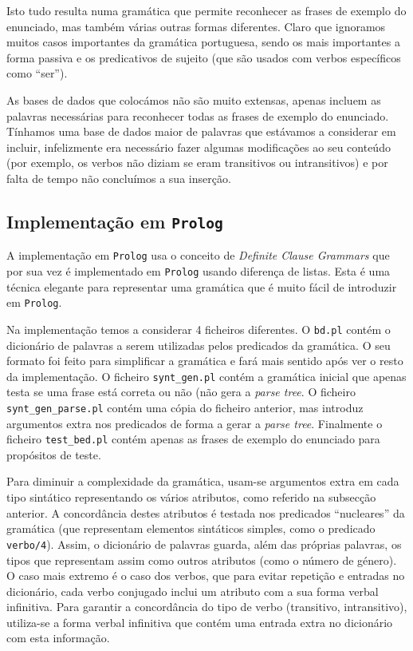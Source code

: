 \documentclass[12pt,a4paper,oneside]{article}
\begin{document}
Isto tudo resulta numa gramática que permite reconhecer as frases de
exemplo do enunciado, mas também várias outras formas
diferentes. Claro que ignoramos muitos casos importantes da gramática
portuguesa, sendo os mais importantes a forma passiva e os
predicativos de sujeito (que são usados com verbos específicos como
``ser'').

As bases de dados que colocámos não são muito extensas, apenas incluem
as palavras necessárias para reconhecer todas as frases de exemplo do
enunciado. Tínhamos uma base de dados maior de palavras que estávamos
a considerar em incluir, infelizmente era necessário fazer algumas
modificações ao seu conteúdo (por exemplo, os verbos não diziam se
eram transitivos ou intransitivos) \cite{label:2003} e por falta de
tempo não concluímos a sua inserção.

\subsection{Implementação em \texttt{Prolog}}

A implementação em \texttt{Prolog} usa o conceito de \textit{Definite
  Clause Grammars} que por sua vez é implementado em \texttt{Prolog}
usando diferença de listas. Esta é uma técnica elegante para
representar uma gramática que é muito fácil de introduzir em
\texttt{Prolog}.

Na implementação temos a considerar 4 ficheiros diferentes. O
\texttt{bd.pl} contém o dicionário de palavras a serem utilizadas
pelos predicados da gramática. O seu formato foi feito para
simplificar a gramática e fará mais sentido após ver o resto da
implementação. O ficheiro \texttt{synt\_gen.pl} contém a gramática
inicial que apenas testa se uma frase está correta ou não (não gera a
\textit{parse tree}. O ficheiro \texttt{synt\_gen\_parse.pl} contém
uma cópia do ficheiro anterior, mas introduz argumentos extra nos
predicados de forma a gerar a \textit{parse tree}. Finalmente o
ficheiro \texttt{test\_bed.pl} contém apenas as frases de exemplo do
enunciado para propósitos de teste.

Para diminuir a complexidade da gramática, usam-se argumentos extra em
cada tipo sintático representando os vários atributos, como referido
na subsecção anterior. A concordância destes atributos é testada nos
predicados ``nucleares'' da gramática (que representam elementos
sintáticos simples, como o predicado \texttt{verbo/4}). Assim, o
dicionário de palavras guarda, além das próprias palavras, os tipos
que representam assim como outros atributos (como o número de
género). O caso mais extremo é o caso dos verbos, que para evitar
repetição e entradas no dicionário, cada verbo conjugado inclui um
atributo com a sua forma verbal infinitiva. Para garantir a
concordância do tipo de verbo (transitivo, intransitivo), utiliza-se a
forma verbal infinitiva que contém uma entrada extra no dicionário com
esta informação.
\end{document}
